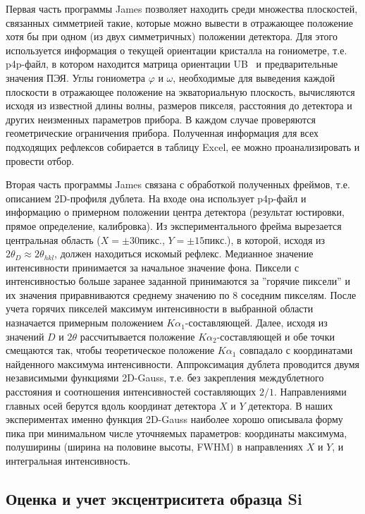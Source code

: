 Первая часть программы James позволяет находить среди множества плоскостей, связанных симметрией такие, которые можно вывести в отражающее положение хотя бы при одном (из двух симметричных) положении детектора.
Для этого используется информация о текущей ориентации кристалла на гониометре, т.е. p4p-файл, в котором находится матрица ориентации UB~\cite{Busing:1967} и предварительные значения ПЭЯ.
Углы гониометра $\varphi$ и $\omega$, необходимые для выведения каждой плоскости в отражающее положение на экваториальную плоскость, вычисляются исходя из известной длины волны, размеров пикселя, расстояния до детектора и других неизменных параметров прибора.
В каждом случае проверяются геометрические ограничения прибора.
Полученная информация для всех подходящих рефлексов собирается в таблицу Excel, ее можно проанализировать и провести отбор.

Вторая часть программы James связана с обработкой полученных фреймов, т.е. описанием 2D-профиля дублета. На входе она использует p4p-файл и информацию о примерном положении центра детектора (результат юстировки, прямое определение, калибровка).
Из экспериментального фрейма вырезается центральная область ($X = \pm 30\unit{пикс.}$, $Y = \pm 15\unit{пикс.}$), в которой, исходя из $2\theta_D \approx 2\theta_{hkl}$, должен находиться искомый рефлекс.
Медианное значение интенсивности принимается за начальное значение фона.
Пиксели с интенсивностью больше заранее заданной принимаются за ''горячие пиксели'' и их значения приравниваются среднему значению по 8 соседним пикселям.
После учета горячих пикселей максимум интенсивности в выбранной области назначается примерным положением $K\alpha_1$-составляющей.
Далее, исходя из значений $D$ и $2\theta$ рассчитывается положение $K\alpha_2$-составляющей и обе точки смещаются так, чтобы теоретическое положение $K\alpha_1$ совпадало с координатами найденного максимума интенсивности.
Аппроксимация дублета проводится двумя независимыми  функциями 2D-Gauss, т.е. без закрепления междублетного расстояния и соотношения интенсивностей составляющих $2/1$.
Направлениями главных осей берутся вдоль координат детектора $X$ и $Y$ детектора.
В наших экспериментах именно функция 2D-Gauss наиболее хорошо описывала форму пика при минимальном числе уточняемых параметров: координаты максимума, полуширины (ширина на половине высоты, FWHM) в направлениях $X$ и $Y$, и интегральная интенсивность.

\subsection{Оценка и учет эксцентриситета образца Si}

